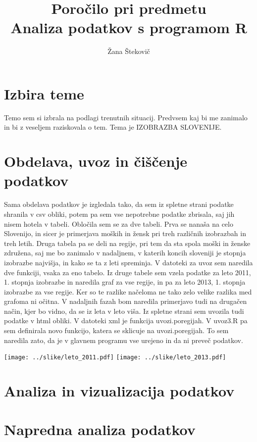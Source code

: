 \documentclass[11pt,a4paper]{article}
\begin{document}
\title{Poročilo pri predmetu \\
Analiza podatkov s programom R}
\author{Žana Štekovič}
\maketitle

\section{Izbira teme}
Temo sem si izbrala na podlagi trenutnih situacij. Predvsem kaj bi me zanimalo in bi z veseljem raziskovala o tem.
Tema je IZOBRAZBA SLOVENIJE.

\section{Obdelava, uvoz in čiščenje podatkov}
Sama obdelava podatkov je izgledala tako, da sem iz spletne strani podatke shranila v csv obliki, potem pa sem vse nepotrebne podatke zbrisala, saj jih nisem hotela v tabeli.
Obločila sem se za dve tabeli. Prva se nanaša na celo Slovenijo, in sicer je primerjava moških in žensk pri treh različnih izobrazbah in treh letih.
Druga tabela pa se deli na regije, pri tem da sta spola moški in ženske združena, saj me bo zanimalo v nadaljnem, v katerih koncih sloveniji je stopnja izobrazbe najvišja, in kako se ta z leti spreminja.
V datoteki za uvoz sem naredila dve funkciji, vsaka za eno tabelo. Iz druge tabele sem vzela podatke za leto 2011, 1. stopnja izobrazbe in naredila graf za vse regije, in pa za leto 2013, 1. stopnja izobrazbe za vse regije. Ker so te razlike načeloma ne tako zelo velike razlika med grafoma ni očitna.
V nadaljnih fazah bom naredila primerjavo tudi na drugačen način, kjer bo vidno, da se iz leta v leto viša.  Iz spletne strani sem uvozila tudi podatke v html obliki. V datoteki xml je funkcija uvozi.poregijah. V uvoz3.R  pa sem definirala novo funkcijo, katera se sklicuje na uvozi.poregijah. To sem naredila zato, da je v glavnem programu vse urejeno in da ni preveč podatkov.

\texttt{[image: ../slike/leto\_2011.pdf]}
\texttt{[image: ../slike/leto\_2013.pdf]}

\section{Analiza in vizualizacija podatkov}


\section{Napredna analiza podatkov}

\end{document}
